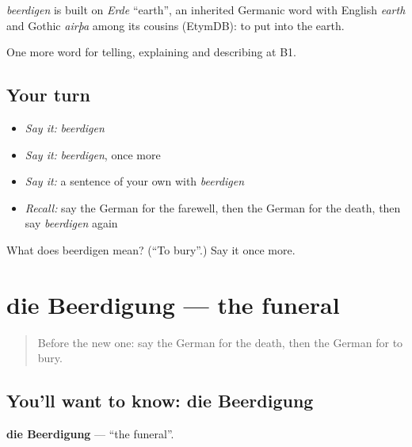 \begin{cousinweb}
\emph{beerdigen} is built on \emph{Erde} \textquotedblleft{}earth\textquotedblright{}, an inherited Germanic word with English \emph{earth} and Gothic \emph{airþa} among its cousins (EtymDB): to put into the earth.
\end{cousinweb}

\begin{grammarlens}[title={What you've built}]
One more word for telling, explaining and describing at B1.
\end{grammarlens}

\subsection*{Your turn}
\begin{itemize}
\raggedright
  \item \emph{Say it:} \emph{beerdigen}
  \item \emph{Say it:} \emph{beerdigen}, once more
  \item \emph{Say it:} a sentence of your own with \emph{beerdigen}
  \item \emph{Recall:} say the German for the farewell, then the German for the death, then say \emph{beerdigen} again
\end{itemize}

\begin{tcolorbox}[breakable,colback=teal!4,colframe=teal!35!black,title={Before you move on}]
What does beerdigen mean? (\textquotedblleft{}To bury\textquotedblright{}.) Say it once more.
\end{tcolorbox}
\section[die Beerdigung]{die Beerdigung — the funeral}

\label{lesson:GE-C303-beerdigung}



\begin{quote}
Before the new one: say the German for the death, then the German for to bury.
\end{quote}

\subsection*{You'll want to know: die Beerdigung}
\textbf{die Beerdigung} — \textquotedblleft{}the funeral\textquotedblright{}.

